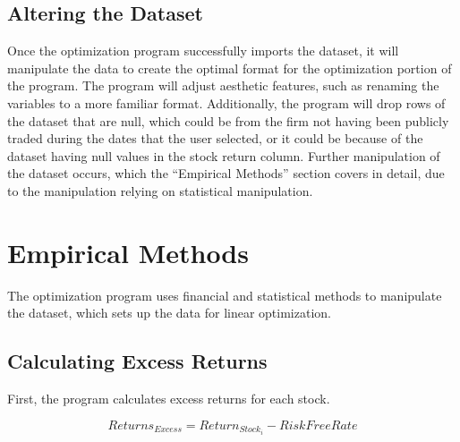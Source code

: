 \documentclass[12pt,english]{article}
\begin{document}
\begin{doublespace}
        \subsection{Altering the Dataset}
        \indent{}\indent{}
        Once the optimization program successfully imports the dataset, it will manipulate the data to create the optimal format for the optimization portion of the program. The program will adjust aesthetic features, such as renaming the variables to a more familiar format. Additionally, the program will drop rows of the dataset that are null, which could be from the firm not having been publicly traded during the dates that the user selected, or it could be because of the dataset having null values in the stock return column. Further manipulation of the dataset occurs, which the “Empirical Methods” section covers in detail, due to the manipulation relying on statistical manipulation.


    \section{Empirical Methods}\label{sec:methods}\indent{}\indent{} %
    
        The optimization program uses financial and statistical methods to manipulate the dataset, which sets up the data for linear optimization. 
        
        \subsection{Calculating Excess Returns}
        
    	    First, the program calculates excess returns for each stock.
    	    
                \end{doublespace}
                    \begin{singlespace}
                        \begin{center}
                            \begin{equation} \label{Excess Returns}
                                Returns_{Excess} = Return_{Stock_{i}} - RiskFreeRate
                            \end{equation}
                        \end{center}
                    \end{singlespace}
\end{document}
